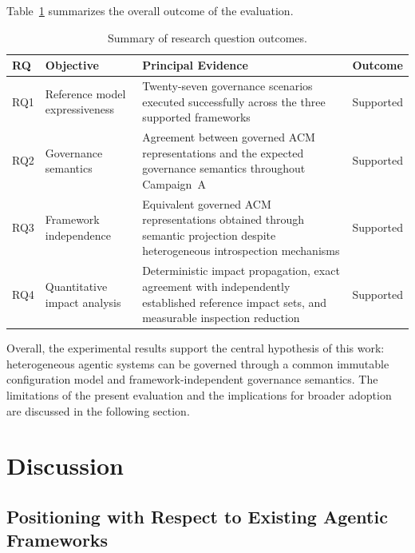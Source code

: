 \documentclass[10pt]{article}
\begin{document}
Table~\ref{tab:rq_summary} summarizes the overall outcome of the evaluation.

\begin{table}[ht]
	\centering
	\caption{Summary of research question outcomes.}
	\label{tab:rq_summary}
	\small
	\begin{tabular}{p{0.9cm}p{2.5cm}p{5.1cm}p{1.6cm}}
		\toprule
		\textbf{RQ} &
		\textbf{Objective} &
		\textbf{Principal Evidence} &
		\textbf{Outcome}
		\\
		\midrule
		
		RQ1 &
		Reference model expressiveness &
		Twenty-seven governance scenarios executed successfully across the three supported frameworks &
		Supported
		\\
		
		RQ2 &
		Governance semantics &
		Agreement between governed ACM representations and the expected governance semantics throughout Campaign~A &
		Supported
		\\
		
		RQ3 &
		Framework independence &
		Equivalent governed ACM representations obtained through semantic projection despite heterogeneous introspection mechanisms &
		Supported
		\\
		
		RQ4 &
		Quantitative impact analysis &
		Deterministic impact propagation, exact agreement with independently established reference impact sets, and measurable inspection reduction &
		Supported
		\\
		
		\bottomrule
	\end{tabular}
\end{table}

Overall, the experimental results support the central hypothesis of this work: heterogeneous agentic systems can be governed through a common immutable configuration model and framework-independent governance semantics. The limitations of the present evaluation and the implications for broader adoption are discussed in the following section.

\section{Discussion}
\label{sec:discussion}
\subsection{Positioning with Respect to Existing Agentic Frameworks}
\label{sec:positioning}
\end{document}
